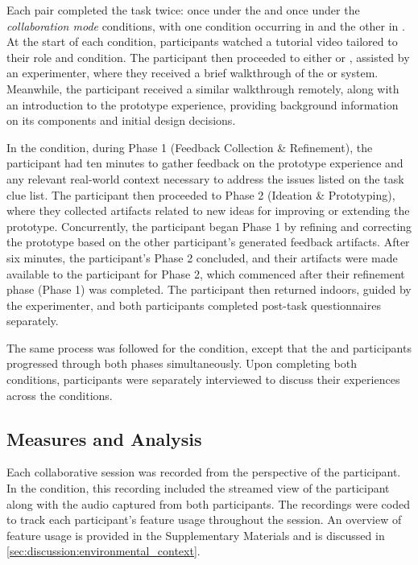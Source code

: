 Each pair completed the task twice: once under the \sync and once under the \async \textit{collaboration mode} conditions, with one condition occurring in \locA and the other in \locB. At the start of each condition, participants watched a tutorial video tailored to their role and condition. The \insitu participant then proceeded to either \locA or \locB, assisted by an experimenter, where they received a brief walkthrough of the \sync or \async system. Meanwhile, the \exsitu participant received a similar walkthrough remotely, along with an introduction to the prototype experience, providing background information on its components and initial design decisions.

In the \async condition, during Phase 1 (Feedback Collection \& Refinement), the \insitu participant had ten minutes to gather feedback on the prototype experience and any relevant real-world context necessary to address the issues listed on the task clue list. The \insitu participant then proceeded to Phase 2 (Ideation \& Prototyping), where they collected artifacts related to new ideas for improving or extending the prototype. Concurrently, the \exsitu participant began Phase 1 by refining and correcting the prototype based on the other participant's generated feedback artifacts. After six minutes, the \insitu participant's Phase 2 concluded, and their artifacts were made available to the \exsitu participant for Phase 2, which commenced after their refinement phase (Phase 1) was completed. The \insitu participant then returned indoors, guided by the experimenter, and both participants completed post-task questionnaires separately.

The same process was followed for the \sync condition, except that the \insitu and \exsitu participants progressed through both phases simultaneously. Upon completing both conditions, participants were separately interviewed to discuss their experiences across the conditions.

\subsection{Measures and Analysis}
Each collaborative session was recorded from the perspective of the \exsitu participant. In the \sync condition, this recording included the streamed view of the \insitu participant along with the audio captured from both participants. The recordings were coded to track each participant's feature usage throughout the session. An overview of feature usage is provided in the Supplementary Materials and is discussed in \cref{sec:discussion:environmental_context}.

